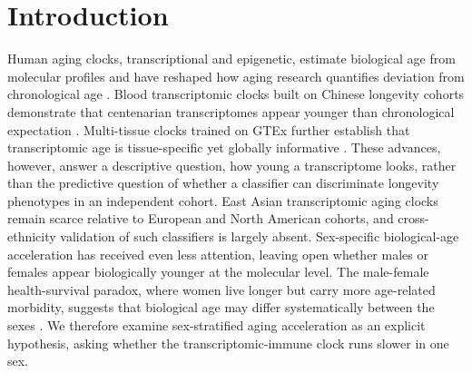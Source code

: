 \documentclass[unnumsec,webpdf,contemporary,large]{oup-authoring-template}
\begin{document}
\maketitle

\section{Introduction}\label{sec:intro}
Human aging clocks, transcriptional and epigenetic, estimate biological age from molecular profiles and have reshaped how aging research quantifies deviation from chronological age \cite{horvath2013dna,hannum2013genome,levine2018epigenetic,lu2019dna,jylhava2017biological,klemera2006new,belsky2020quantification,levine_2019,lu_2019,zhang_2019,lowe_2016,liu_2024,zhou_2023,jothi_2025,ebiomedicine_2026,chen_2026,grolaux_2026,zhang_2026,zhou_2026,gurinovich_2019,partridge2018new}. Blood transcriptomic clocks built on Chinese longevity cohorts demonstrate that centenarian transcriptomes appear younger than chronological expectation \cite{peters2015transcriptional,marioni2015transcriptomic,xiao2019aging}. Multi-tissue clocks trained on GTEx further establish that transcriptomic age is tissue-specific yet globally informative \cite{orange2026brief,mamoshina2018machine,holzscheck2021modeling,ferrari2022multi,kogan2017transcriptomic,shokhirev2019modeling,gtex2015consortium,gtex2020consortium}. These advances, however, answer a descriptive question, how young a transcriptome looks, rather than the predictive question of whether a classifier can discriminate longevity phenotypes in an independent cohort. East Asian transcriptomic aging clocks remain scarce relative to European and North American cohorts, and cross-ethnicity validation of such classifiers is largely absent. Sex-specific biological-age acceleration has received even less attention, leaving open whether males or females appear biologically younger at the molecular level. The male-female health-survival paradox, where women live longer but carry more age-related morbidity, suggests that biological age may differ systematically between the sexes \cite{austad_2006,hagg_2021}. We therefore examine sex-stratified aging acceleration as an explicit hypothesis, asking whether the transcriptomic-immune clock runs slower in one sex.
\end{document}

